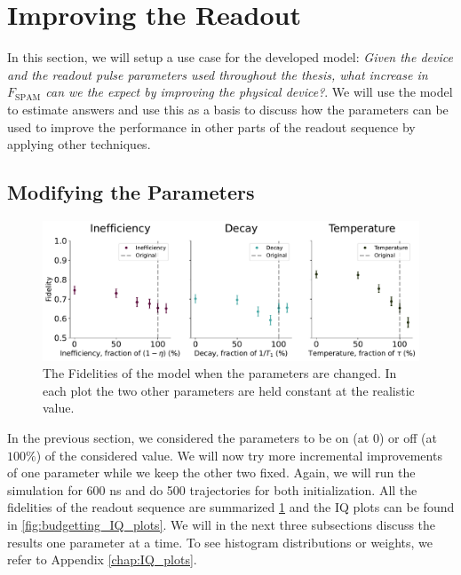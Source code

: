 \section{Improving the Readout}
In this section, we will setup a use case for the developed model: \textit{Given the device and the readout pulse parameters used throughout the thesis, what increase in $F_{\text{SPAM}}$ can we the expect by improving the physical device?}. We will use the model to estimate answers and use this as a basis to discuss how the parameters can be used to improve the performance in other parts of the readout sequence by applying other techniques. 




\subsection{Modifying the Parameters}
\begin{figure}[t]
    \centering
    \includegraphics[width = \linewidth]{Simulations/budgets/figures/fidelities_at_different_parameters.pdf}
    \caption{The Fidelities of the model when the parameters are changed. In each plot the two other parameters are held constant at the realistic value.}
    \label{fig:scan_of_fidelities_at_different_parameters}
\end{figure}
In the previous section, we considered the parameters to be on (at $0$) or off (at $100 \%$) of the considered value. We will now try more incremental improvements of one parameter while we keep the other two fixed. Again, we will run the simulation for 600 ns and do 500 trajectories for both initialization. All the fidelities of the readout sequence are summarized \ref{fig:scan_of_fidelities_at_different_parameters} and the IQ plots can be found in \ref{fig:budgetting_IQ_plots}. We will in the next three subsections discuss the results one parameter at a time. To see histogram distributions or weights, we refer to Appendix \ref{chap:IQ_plots}.

